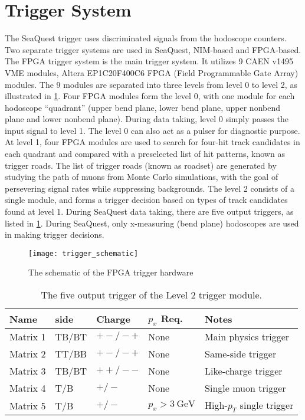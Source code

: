 \documentclass[../main.tex]{subfiles}
\begin{document}
\section{Trigger System}
The SeaQuest trigger uses discriminated signals from the hodoscope counters.
Two separate trigger systems are used in SeaQuest, NIM-based and FPGA-based.
The FPGA trigger system is the main trigger system. It utilizes 9 CAEN
v1495 VME modules, Altera EP1C20F400C6 FPGA (Field Programmable Gate Array)
modules. The 9 modules are separated into three levels from level 0 to level
2, as illustrated in \cref{fig:trigger}.
Four FPGA modules form the level 0, with one module for each hodoscope
``quadrant'' (upper bend plane, lower bend plane, upper nonbend plane and
lower nonbend plane). During data taking, level 0 simply passes the input signal
to level 1. The level 0 can also act as a pulser for diagnostic purpose.
At level 1, four FPGA modules are used to search for four-hit track
candidates in each quadrant and compared with a preselected list of hit
patterns, known as trigger roads. The list of trigger roads (known as roadset)
are generated by studying the path of muons from Monte Carlo simulations, with
the goal of persevering signal rates while suppressing backgrounds.
The level 2 consists of a single module, and forms
a trigger decision based on types of track candidates found at level 1. During
SeaQuest data taking, there are five output triggers, as listed in \cref{tab:FPGA}.
During SeaQuest, only x-measuring (bend plane) hodoscopes are used in making
trigger decisions.
\begin{figure}
	\centering
	\texttt{[image: trigger\_schematic]}
	\caption{The schematic of the FPGA trigger hardware}
	\label{fig:trigger}
\end{figure}
\begin{table}[h!]
	\centering
	\caption{The five output trigger of the Level 2 trigger module.}
	\label{tab:FPGA}
	\begin{tabular}{lllll}
		Name     & side  & Charge  & $p_x$ Req.         & Notes                     \\ \hline
		Matrix 1 & TB/BT & $+-/-+$ & None               & Main physics trigger      \\
		Matrix 2 & TT/BB & $+-/-+$ & None               & Same-side trigger         \\
		Matrix 3 & TB/BT & $++/--$ & None               & Like-charge trigger       \\
		Matrix 4 & T/B   & $+/-$   & None               & Single muon trigger       \\
		Matrix 5 & T/B   & $+/-$   & $p_x>\SI{3}{\GeV}$ & High-$p_T$ single trigger \\ \hline
	\end{tabular}
\end{table}
\end{document}
